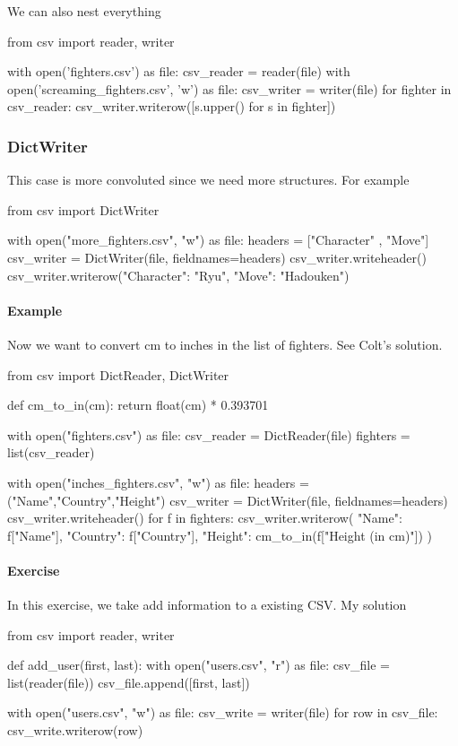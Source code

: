 We can also nest everything 
\begin{listing}{1}
from csv import reader, writer

with open('fighters.csv') as file:
    csv_reader = reader(file)
    with open('screaming_fighters.csv', 'w') as file:
        csv_writer = writer(file)
        for fighter in csv_reader:
            csv_writer.writerow([s.upper() for s in fighter])    
\end{listing}


\subsubsection{DictWriter}
 
This case is more convoluted since we need more structures. For example
\begin{listing}{1}
from csv import DictWriter

with open("more_fighters.csv", "w") as file:
    headers = ["Character" , "Move"]
    csv_writer = DictWriter(file, fieldnames=headers)
    csv_writer.writeheader()
    csv_writer.writerow({"Character": "Ryu", "Move": "Hadouken"})
\end{listing}

\paragraph{Example}

Now we want to convert cm to inches in the list of fighters. See Colt's solution. 
\begin{listing}{1}
from csv import DictReader, DictWriter

def cm_to_in(cm):
    return float(cm) * 0.393701

with open("fighters.csv") as file:
    csv_reader = DictReader(file)
    fighters = list(csv_reader)

with open("inches_fighters.csv", "w") as file:
    headers = ("Name","Country","Height")
    csv_writer = DictWriter(file, fieldnames=headers)
    csv_writer.writeheader()
    for f in fighters:
        csv_writer.writerow({
            "Name": f["Name"],
            "Country": f["Country"],
            "Height": cm_to_in(f["Height (in cm)"])
        })    
\end{listing}

\paragraph{Exercise} In this exercise, we take add information to a existing CSV. My solution
\begin{listing}{1}
from csv import reader, writer

def add_user(first, last):
    with open("users.csv", "r") as file:
        csv_file = list(reader(file))
        csv_file.append([first, last])
    
    with open("users.csv", "w") as file:
        csv_write = writer(file)
        for row in csv_file:
            csv_write.writerow(row)    
\end{listing}

